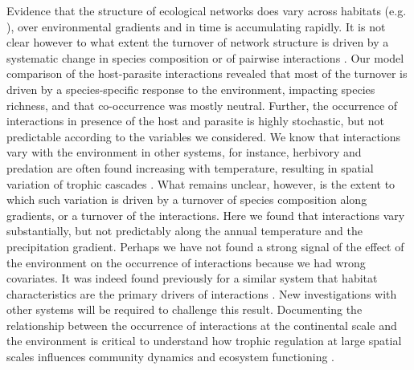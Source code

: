 \documentclass[12pt]{article}
\begin{document}
Evidence that the structure of ecological networks does vary across habitats
(e.g. \citealt{Tylianakis2007, Plein2012}), over environmental gradients
\citealt{Lurgi2010} and in time \citep{Trolsgaard2015} is accumulating
rapidly. It is not clear however to what extent the turnover of network
structure is driven by a systematic change in species composition or of
pairwise interactions \citep{Poisot2012, Poisot2015a}. Our model comparison of
the host-parasite interactions revealed that most of the turnover is driven by
a species-specific response to the environment, impacting species richness,
and that co-occurrence was mostly neutral. Further, the occurrence of
interactions in presence of the host and parasite is highly stochastic, but
not predictable according to the variables we considered. We know that
interactions vary with the environment in other systems, for instance,
herbivory \citep{Shurin2012} and predation \citep{McKinnon2010, Legagneux2014}
are often found increasing with temperature, resulting in spatial variation of
trophic cascades \citep{(Gray2016}. What remains unclear, however, is the
extent to which such variation is driven by a turnover of species composition
along gradients, or a turnover of the interactions. Here we found that
interactions vary substantially, but not predictably along the annual
temperature and the precipitation gradient. Perhaps we have not found a strong
signal of the effect of the environment on the occurrence of interactions
because we had wrong covariates. It was indeed found previously for a similar
system that habitat characteristics are the primary drivers of interactions
\citep{Nyman2015}. New investigations with other systems will be required to
challenge this result. Documenting the relationship between the occurrence of
interactions at the continental scale and the environment is critical to
understand how trophic regulation at large spatial scales influences
community dynamics and ecosystem functioning  \citep{Harfoot2013}.
\end{document}

